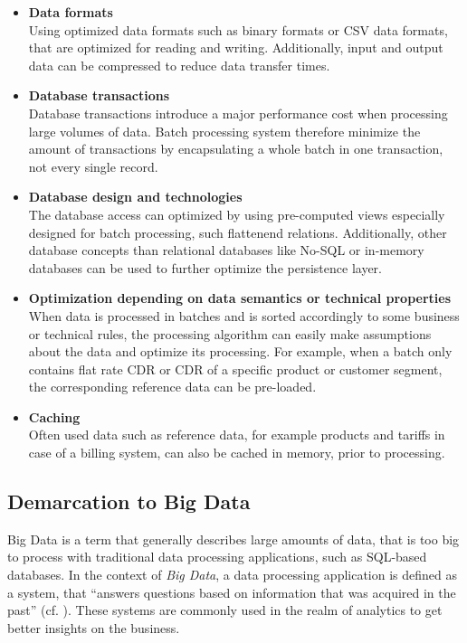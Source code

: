 \begin{itemize}
	\item \textbf{Data formats}\\
	Using optimized data formats such as binary formats or \ac{CSV} data formats, that are optimized for reading and writing. Additionally, input and output data can be compressed to reduce data transfer times.
	\item \textbf{Database transactions}\\
	Database transactions introduce a major performance cost when processing large volumes of data. Batch processing system therefore minimize the amount of transactions by encapsulating a whole batch in one transaction, not every single record.
	\item \textbf{Database design and technologies}\\
	The database access can optimized by using pre-computed views especially designed for batch processing, such flattenend relations.
	Additionally, other database concepts than relational databases like No-SQL or in-memory databases can be used to further optimize the persistence layer.
	\item \textbf{Optimization depending on data semantics or technical properties}\\
	When data is processed in batches and is sorted accordingly to some business or technical rules, the processing algorithm can easily make assumptions about the data and optimize its processing. For example, when a batch only contains flat rate \ac{CDR} or \ac{CDR} of a specific product or customer segment, the corresponding reference data can be pre-loaded.
	\item \textbf{Caching}\\
	Often used data such as reference data, for example products and tariffs in case of a billing system, can also be cached in memory, prior to processing.
\end{itemize}

\subsection{Demarcation to Big Data}
Big Data is a term that generally describes large amounts of data, that is too big to process with traditional data processing applications, such as \ac{SQL}-based databases. In the context of \emph{Big Data}, a data processing application is defined as a system, that ``answers questions based on information that was acquired in the past'' (cf. \cite{Merz:2014aa}). These systems are commonly used in the realm of analytics to get better insights on the business. 

